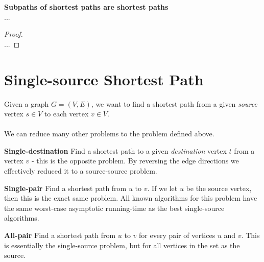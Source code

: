\begin{lemma}
	\textbf{Subpaths of shortest paths are shortest paths} \\
	...
\end{lemma} 

\begin{proof} \textnormal{\cite[p.~645, thm.~24.1]{clrs}} \\
	...
\end{proof}

\newpage
\section{Single-source Shortest Path}
Given a graph $G = (V, E)$, we want to find a shortest path from a given
\textit{source} vertex $s \in V$ to each vertex $v \in V$.
\\\\
\noindent We can reduce many other problems to the problem defined above.
\begin{description}
	\item \textbf{Single-destination} Find a shortest path to a given
\textit{destination} vertex $t$ from a vertex $v$ - this is the opposite
problem. By reversing the edge directions we effectively reduced it to a
source-source problem.
	\item \textbf{Single-pair} Find a shortest path from $u$ to $v$. If we let
$u$ be the source vertex, then this is the exact same problem. All known
algorithms for this problem have the same worst-case asymptotic running-time
as the best single-source algorithms. %
	\item \textbf{All-pair} Find a shortest path from $u$ to $v$ for every
pair of vertices $u$ and $v$. This is essentially the single-source problem,
but for all vertices in the set as the source.
\end{description}


